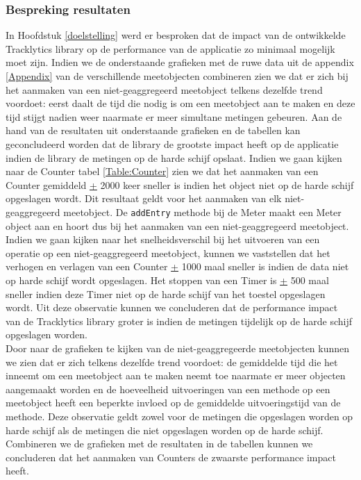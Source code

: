 \subsubsection{Bespreking resultaten}
In Hoofdstuk \ref{doelstelling} werd er besproken dat de impact van de ontwikkelde Tracklytics library op de performance van de applicatie zo minimaal mogelijk moet zijn. Indien we de onderstaande grafieken met de ruwe data uit de appendix \ref{Appendix} van de verschillende meetobjecten combineren zien we dat er zich bij het aanmaken van een niet-geaggregeerd meetobject telkens dezelfde trend voordoet: eerst daalt de tijd die nodig is om een meetobject aan te maken en deze tijd stijgt nadien weer naarmate er meer simultane metingen gebeuren. Aan de hand van de resultaten uit onderstaande grafieken en de tabellen kan geconcludeerd worden dat de library de grootste impact heeft op de applicatie indien de library de metingen op de harde schijf opslaat. Indien we gaan kijken naar de Counter tabel \ref{Table:Counter} zien we dat het aanmaken van een Counter gemiddeld \underline{+} 2000 keer sneller is indien het object niet op de harde schijf opgeslagen wordt. Dit resultaat geldt voor het aanmaken van elk niet-geaggregeerd meetobject. De \texttt{addEntry} methode bij de Meter maakt een Meter object aan en hoort dus bij het aanmaken van een niet-geaggregeerd meetobject. Indien we gaan kijken naar het snelheidsverschil bij het uitvoeren van een operatie op een niet-geaggregeerd meetobject, kunnen we vaststellen dat het verhogen en verlagen van een Counter \underline{+} 1000 maal sneller is indien de data niet op harde schijf wordt opgeslagen. Het stoppen van een Timer is \underline{+} 500 maal sneller indien deze Timer niet op de harde schijf van het toestel opgeslagen wordt. Uit deze observatie kunnen we concluderen dat de performance impact van de Tracklytics library groter is indien de metingen tijdelijk op de harde schijf opgeslagen worden. \\

Door naar de grafieken te kijken van de niet-geaggregeerde meetobjecten kunnen we zien dat er zich telkens dezelfde trend voordoet: de gemiddelde tijd die het inneemt om een meetobject aan te maken neemt toe naarmate er meer objecten aangemaakt worden en de hoeveelheid uitvoeringen van een methode op een meetobject heeft een beperkte invloed op de gemiddelde uitvoeringstijd van de methode. Deze observatie geldt zowel voor de metingen die opgeslagen worden op harde schijf als de metingen die niet opgeslagen worden op de harde schijf. Combineren we de grafieken met de resultaten in de tabellen kunnen we concluderen dat het aanmaken van Counters de zwaarste performance impact heeft. \\

